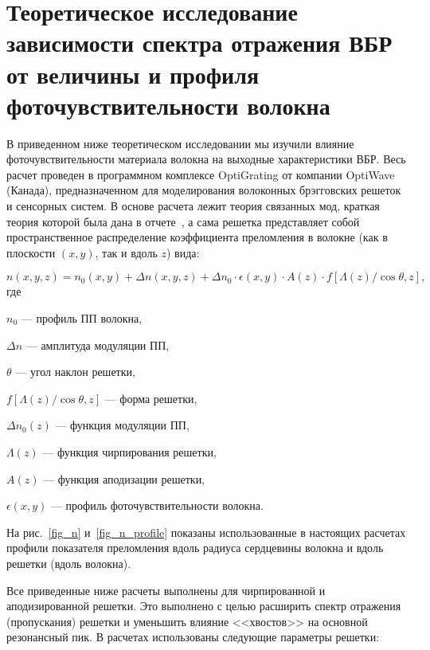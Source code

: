 
\section{Теоретическое исследование зависимости спектра отражения ВБР от величины и профиля фоточувствительности волокна}
\label{sect3_2}

В приведенном ниже теоретическом исследовании мы изучили влияние фоточувствительности материала волокна на выходные характеристики ВБР. Весь расчет проведен в программном комплексе OptiGrating от компании OptiWave (Канада), предназначенном для моделирования волоконных брэгговских решеток и сенсорных систем. В основе расчета лежит теория связанных мод, краткая теория которой была дана в отчете~\cite{report_chudinov_2010}, а сама решетка представляет собой пространственное распределение коэффициента преломления в волокне (как в плоскости $(x,y)$, так и вдоль $z$) вида:

\begin{equation} \label{eq2.10}
  n(x,y,z)=n_0(x,y)+\Delta n (x,y,z)+\Delta n_0 \cdot \epsilon(x,y) \cdot A(z) \cdot f[\Lambda(z)/\cos \theta, z],
\end{equation}
где

\begin{list}{}{}
\item {$n_0$ --- профиль ПП волокна,}
\item {$\Delta n$ --- амплитуда модуляции ПП,}
\item {$\theta$ --- угол наклон решетки,}
\item {$f[\Lambda(z)/\cos \theta, z]$ --- форма решетки,}
\item {$\Delta n_0 (z)$ --- функция модуляции ПП,}
\item {$\Lambda(z)$ --- функция чирпирования решетки,}
\item {$A(z)$ --- функция аподизации решетки,}
\item {$\epsilon(x,y)$ --- профиль фоточувствительности волокна.}
\end{list}

На рис.~\ref{fig_n} и~\ref{fig_n_profile} показаны использованные в настоящих расчетах профили показателя преломления вдоль радиуса сердцевины волокна и вдоль решетки (вдоль волокна).

Все приведенные ниже расчеты выполнены для чирпированной и аподизированной решетки. Это выполнено с целью расширить спектр отражения (пропускания) решетки и уменьшить влияние <<хвостов>> на основной резонансный пик. В расчетах использованы следующие параметры решетки:


